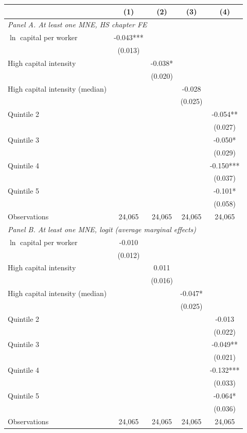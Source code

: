 \begin{tabular}{l*{4}{c}}
\toprule
 & (1) & (2) & (3) & (4) \\
\midrule
\multicolumn{5}{l}{\textit{Panel A. At least one MNE, HS chapter FE}} \\
$\ln$ capital per worker & -0.043*** &  &  &  \\
 & (0.013) &  &  &  \\
High capital intensity &  & -0.038* &  &  \\
 &  & (0.020) &  &  \\
High capital intensity (median) &  &  & -0.028 &  \\
 &  &  & (0.025) &  \\
Quintile 2 &  &  &  & -0.054** \\
 &  &  &  & (0.027) \\
Quintile 3 &  &  &  & -0.050* \\
 &  &  &  & (0.029) \\
Quintile 4 &  &  &  & -0.150*** \\
 &  &  &  & (0.037) \\
Quintile 5 &  &  &  & -0.101* \\
 &  &  &  & (0.058) \\
Observations & 24,065 & 24,065 & 24,065 & 24,065 \\
\midrule
\multicolumn{5}{l}{\textit{Panel B. At least one MNE, logit (average marginal effects)}} \\
$\ln$ capital per worker & -0.010 &  &  &  \\
 & (0.012) &  &  &  \\
High capital intensity &  & 0.011 &  &  \\
 &  & (0.016) &  &  \\
High capital intensity (median) &  &  & -0.047* &  \\
 &  &  & (0.025) &  \\
Quintile 2 &  &  &  & -0.013 \\
 &  &  &  & (0.022) \\
Quintile 3 &  &  &  & -0.049** \\
 &  &  &  & (0.021) \\
Quintile 4 &  &  &  & -0.132*** \\
 &  &  &  & (0.033) \\
Quintile 5 &  &  &  & -0.064* \\
 &  &  &  & (0.036) \\
Observations & 24,065 & 24,065 & 24,065 & 24,065 \\
\bottomrule
\end{tabular}
